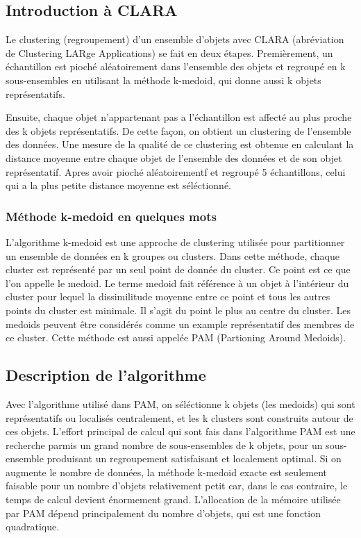 \documentclass[report]{subfiles}
\begin{document}
\maketitle

\subsection{Introduction à CLARA} %
Le clustering (regroupement) d'un ensemble d'objets avec CLARA (abréviation de Clustering LARge Applications) se fait en deux étapes. Premièrement, un échantillon est pioché aléatoirement dans l'ensemble des objets et regroupé en k sous-ensembles en utilisant la méthode k-medoid, qui donne aussi k objets représentatifs.

Ensuite, chaque objet n'appartenant pas a l'échantillon est affecté au plus proche des k objets représentatifs. De cette façon, on obtient un clustering de l'ensemble des données. Une mesure de la qualité de ce clustering est obtenue en calculant la distance moyenne entre chaque objet de l'ensemble des données et de son objet représentatif. Apres avoir pioché aléatoirementf et regroupé 5 échantillons, celui qui a la plus petite distance moyenne est séléctionné.

\subsubsection{Méthode k-medoid en quelques mots}
L'algorithme k-medoid est une approche de clustering utilisée pour partitionner un ensemble de données en k groupes ou clusters. Dans cette méthode, chaque cluster est représenté par un seul point de donnée du cluster. Ce point est ce que l'on appelle le medoid.
Le terme medoid fait référence à un objet à l'intérieur du cluster pour lequel la dissimilitude moyenne entre ce point et tous les autres points du cluster est minimale. Il s'agit du point le plus au centre du cluster. Les medoids peuvent être considérés comme un example représentatif des membres de ce cluster.
Cette méthode est aussi appelée PAM (Partioning Around Medoids).

\subsection{Description de l'algorithme}
Avec l'algorithme utilisé dans PAM, on séléctionne k objets (les medoids) qui sont représentatifs ou localisés centralement, et les k clusters sont construits autour de ces objets. L'effort principal de calcul qui sont fais dans l'algorithme  PAM est une recherche parmis un grand nombre de sous-ensembles de k objets, pour un sous-ensemble produisant un regroupement satisfaisant et localement optimal. Si on augmente le nombre de données, la méthode k-medoid exacte est seulement faisable pour un nombre d'objets relativement petit car, dans le cas contraire, le temps de calcul devient énormement grand. L'allocation de la mémoire utilisée par PAM dépend principalement du nombre d'objets, qui est une fonction quadratique.
\end{document}
